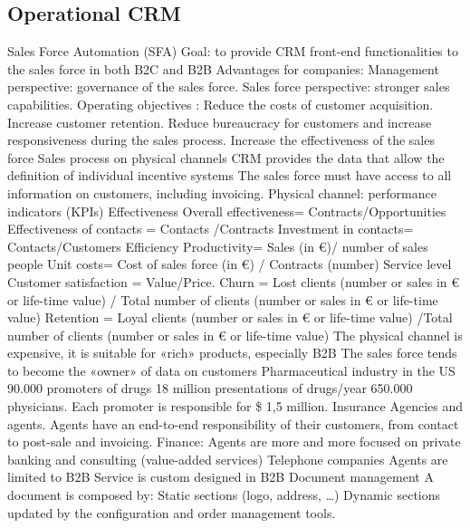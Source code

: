 \subsection{Operational CRM}
Sales Force Automation (SFA)
Goal: to provide CRM front-end functionalities to the sales force in both B2C and B2B
Advantages for companies:
Management perspective: governance of the sales force.
Sales force perspective: stronger sales capabilities.
Operating objectives :
Reduce the costs of customer acquisition.
Increase customer retention.
Reduce bureaucracy for customers and increase responsiveness during the sales process.
Increase the effectiveness of the sales force
Sales process on physical channels
CRM provides the data that allow the definition of individual incentive
systems
The sales force must have access to all information on customers,
including invoicing.
Physical channel: performance indicators (KPIs)
Effectiveness
Overall effectiveness= Contracts/Opportunities
Effectiveness of contacts = Contacts /Contracts
Investment in contacts= Contacts/Customers
Efficiency
Productivity= Sales (in €)/ number of sales people
Unit costs= Cost of sales force (in €) / Contracts (number)
Service level
Customer satisfaction = Value/Price.
Churn = Lost clients (number or sales in € or life-time value) / Total number of clients (number or
sales in € or life-time value)
Retention = Loyal clients (number or sales in € or life-time value) /Total number of clients
(number or sales in € or life-time value)
The physical channel is expensive, it is suitable for «rich» products, especially B2B
The sales force tends to become the «owner» of data on customers
Pharmaceutical industry in the US
90.000 promoters of drugs
18 million presentations of drugs/year
650.000 physicians.
Each promoter is responsible for \$ 1,5 million.
Insurance
Agencies and agents.
Agents have an end-to-end responsibility of their customers, from contact to post-sale and invoicing.
Finance:
Agents are more and more focused on private banking and consulting (value-added services)
Telephone companies
Agents are limited to B2B
Service is custom designed in B2B
Document management
A document is composed by:
Static sections (logo, address, …)
Dynamic sections updated by the
configuration and order management tools.

